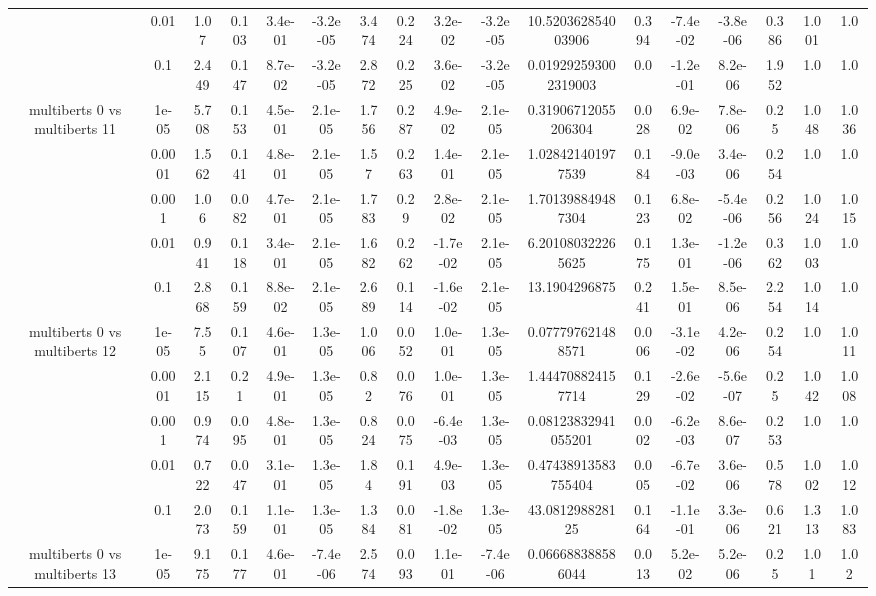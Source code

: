 \begin{tabular}{|c|c|c|c|c|c|c|c|c|c|c|c|c|c|c|c|c|}
 & 0.01 & 1.07 & 0.103 & 3.4e-01 & -3.2e-05 & 3.474 & 0.224 & 3.2e-02 & -3.2e-05 & 10.520362854003906 & 0.394 & -7.4e-02 & -3.8e-06 & 0.386 & 1.001 & 1.0 \\
 & 0.1 & 2.449 & 0.147 & 8.7e-02 & -3.2e-05 & 2.872 & 0.225 & 3.6e-02 & -3.2e-05 & 0.019292593002319003 & 0.0 & -1.2e-01 & 8.2e-06 & 1.952 & 1.0 & 1.0 \\
\hline
\multirow{5}{*}{multiberts 0 vs multiberts 11} & 1e-05 & 5.708 & 0.153 & 4.5e-01 & 2.1e-05 & 1.756 & 0.287 & 4.9e-02 & 2.1e-05 & 0.31906712055206304 & 0.028 & 6.9e-02 & 7.8e-06 & 0.25 & 1.048 & 1.036 \\
 & 0.0001 & 1.562 & 0.141 & 4.8e-01 & 2.1e-05 & 1.57 & 0.263 & 1.4e-01 & 2.1e-05 & 1.028421401977539 & 0.184 & -9.0e-03 & 3.4e-06 & 0.254 & 1.0 & 1.0 \\
 & 0.001 & 1.06 & 0.082 & 4.7e-01 & 2.1e-05 & 1.783 & 0.29 & 2.8e-02 & 2.1e-05 & 1.701398849487304 & 0.123 & 6.8e-02 & -5.4e-06 & 0.256 & 1.024 & 1.015 \\
 & 0.01 & 0.941 & 0.118 & 3.4e-01 & 2.1e-05 & 1.682 & 0.262 & -1.7e-02 & 2.1e-05 & 6.201080322265625 & 0.175 & 1.3e-01 & -1.2e-06 & 0.362 & 1.003 & 1.0 \\
 & 0.1 & 2.868 & 0.159 & 8.8e-02 & 2.1e-05 & 2.689 & 0.114 & -1.6e-02 & 2.1e-05 & 13.1904296875 & 0.241 & 1.5e-01 & 8.5e-06 & 2.254 & 1.014 & 1.0 \\
\hline
\multirow{5}{*}{multiberts 0 vs multiberts 12} & 1e-05 & 7.55 & 0.107 & 4.6e-01 & 1.3e-05 & 1.006 & 0.052 & 1.0e-01 & 1.3e-05 & 0.077797621488571 & 0.006 & -3.1e-02 & 4.2e-06 & 0.254 & 1.0 & 1.011 \\
 & 0.0001 & 2.115 & 0.21 & 4.9e-01 & 1.3e-05 & 0.82 & 0.076 & 1.0e-01 & 1.3e-05 & 1.444708824157714 & 0.129 & -2.6e-02 & -5.6e-07 & 0.25 & 1.042 & 1.008 \\
 & 0.001 & 0.974 & 0.095 & 4.8e-01 & 1.3e-05 & 0.824 & 0.075 & -6.4e-03 & 1.3e-05 & 0.08123832941055201 & 0.002 & -6.2e-03 & 8.6e-07 & 0.253 & 1.0 & 1.0 \\
 & 0.01 & 0.722 & 0.047 & 3.1e-01 & 1.3e-05 & 1.84 & 0.191 & 4.9e-03 & 1.3e-05 & 0.47438913583755404 & 0.005 & -6.7e-02 & 3.6e-06 & 0.578 & 1.002 & 1.012 \\
 & 0.1 & 2.073 & 0.159 & 1.1e-01 & 1.3e-05 & 1.384 & 0.081 & -1.8e-02 & 1.3e-05 & 43.081298828125 & 0.164 & -1.1e-01 & 3.3e-06 & 0.621 & 1.313 & 1.083 \\
\hline
\multirow{5}{*}{multiberts 0 vs multiberts 13} & 1e-05 & 9.175 & 0.177 & 4.6e-01 & -7.4e-06 & 2.574 & 0.093 & 1.1e-01 & -7.4e-06 & 0.066688388586044 & 0.013 & 5.2e-02 & 5.2e-06 & 0.25 & 1.01 & 1.02 \\

\end{tabular}
